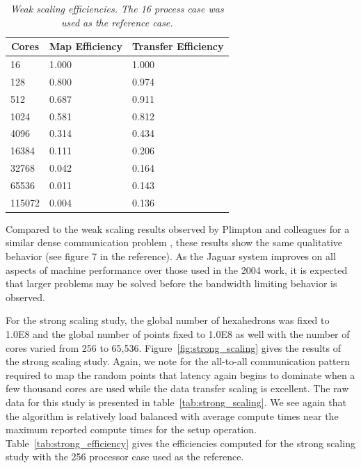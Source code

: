 \documentclass{mc2013}
\begin{document}
\begin{table}[htpb!]
  \begin{center}
    \begin{tabular}{lll}\hline\hline
      \multicolumn{1}{c}{Cores}& 
      \multicolumn{1}{c}{Map Efficiency} & 
      \multicolumn{1}{c}{Transfer Efficiency}\\\hline\hline
      16 &	1.000 &	1.000 \\
      128 &	0.800 &	0.974 \\
      512 &	0.687 &	0.911 \\
      1024 &	0.581 &	0.812 \\
      4096 &	0.314 &	0.434 \\
      16384 &	0.111 &	0.206 \\
      32768 &	0.042 &	0.164 \\
      65536 &	0.011 &	0.143 \\
      115072 &	0.004 &	0.136 \\
      \hline\hline
    \end{tabular}
  \end{center}
  \caption{\sl Weak scaling efficiencies. The 16 process case was used
    as the reference case.}
  \label{tab:weak_efficiency}
\end{table}

Compared to the weak scaling results observed by Plimpton and
colleagues for a similar dense communication problem
\cite{Plimpton_2004}, these results show the same qualitative behavior
(see figure 7 in the reference). As the Jaguar system improves on all
aspects of machine performance over those used in the 2004 work, it is
expected that larger problems may be solved before the bandwidth
limiting behavior is observed.

\label{subsec:strong_scaling}
For the strong scaling study, the global number of hexahedrons was
fixed to 1.0E8 and the global number of points fixed to 1.0E8 as well
with the number of cores varied from 256 to
65,536. Figure~\ref{fig:strong_scaling} gives the results of the
strong scaling study. Again, we note for the all-to-all communication
pattern required to map the random points that latency again begins to
dominate when a few thousand cores are used while the data transfer
scaling is excellent. The raw data for this study is presented in
table~\ref{tab:strong_scaling}. We see again that the algorithm is
relatively load balanced with average compute times near the maximum
reported compute times for the setup
operation. Table~\ref{tab:strong_efficiency} gives the efficiencies
computed for the strong scaling study with the 256 processor case used
as the reference.
\end{document}
